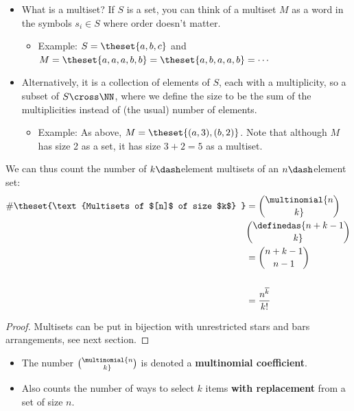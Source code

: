\begin{itemize}
\tightlist
\item
  What is a multiset? If \(S\) is a set, you can think of a multiset
  \(M\) as a word in the symbols \(s_i \in S\) where order doesn't
  matter.

  \begin{itemize}
  \tightlist
  \item
    Example: \(S = \theset{a,b,c}\) and
    \(M = \theset{a,a,a,b,b} = \theset{a,b,a,a,b} = \cdots\)
  \end{itemize}
\item
  Alternatively, it is a collection of elements of \(S\), each with a
  multiplicity, so a subset of \(S \cross \NN\), where we define the
  size to be the sum of the multiplicities instead of (the usual) number
  of elements.

  \begin{itemize}
  \tightlist
  \item
    Example: As above, \(M = \theset{(a, 3), (b,2)}\). Note that
    although \(M\) has size 2 as a set, it has size \(3+2 = 5\) as a
    multiset.
  \end{itemize}
\end{itemize}

\begin{proposition}

We can thus count the number of \(k\dash\)element multisets of an
\(n\dash\)element set:
\begin{align*}\begin{aligned}
\#\theset{\text{Multisets of $[n]$ of size $k$} } &= \multinomial{n\choose k} \\ &\definedas {{n+k-1}\choose k} \\ &= {{n+k-1}\choose n-1} \\ \\ &= \frac{n^{\overline k}}{k!}
\end{aligned}\end{align*}

\end{proposition}

\begin{proof}

Multisets can be put in bijection with unrestricted stars and bars
arrangements, see next section.

\end{proof}

\begin{itemize}
\tightlist
\item
  The number \(\multinomial{n\choose k}\) is denoted a
  \textbf{multinomial coefficient}.
\item
  Also counts the number of ways to select \(k\) items \textbf{with
  replacement} from a set of size \(n\).
\end{itemize}

